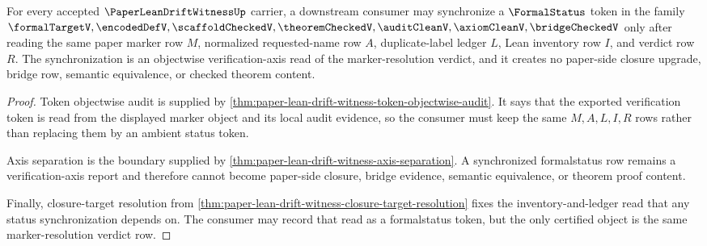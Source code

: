 \begin{theorem}
\label{thm:paper-lean-drift-witness-formalstatus-sync-readiness}
For every accepted $\PaperLeanDriftWitnessUp$ carrier, a downstream consumer may synchronize a $\FormalStatus$ token in the family $\formalTargetV,\encodedDefV,\scaffoldCheckedV,\theoremCheckedV,\auditCleanV,\axiomCleanV,\bridgeCheckedV$ only after reading the same paper marker row $M$, normalized requested-name row $A$, duplicate-label ledger $L$, Lean inventory row $I$, and verdict row $R$. The synchronization is an objectwise verification-axis read of the marker-resolution verdict, and it creates no paper-side closure upgrade, bridge row, semantic equivalence, or checked theorem content.
\end{theorem}
\begin{proof}
Token objectwise audit is supplied by \autoref{thm:paper-lean-drift-witness-token-objectwise-audit}. It says that the exported verification token is read from the displayed marker object and its local audit evidence, so the consumer must keep the same $M,A,L,I,R$ rows rather than replacing them by an ambient status token.

Axis separation is the boundary supplied by \autoref{thm:paper-lean-drift-witness-axis-separation}. A synchronized formalstatus row remains a verification-axis report and therefore cannot become paper-side closure, bridge evidence, semantic equivalence, or theorem proof content.

Finally, closure-target resolution from \autoref{thm:paper-lean-drift-witness-closure-target-resolution} fixes the inventory-and-ledger read that any status synchronization depends on. The consumer may record that read as a formalstatus token, but the only certified object is the same marker-resolution verdict row.
\end{proof}

